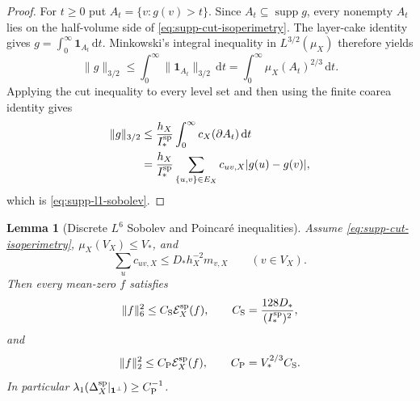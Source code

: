 \documentclass[11pt]{article}
\numberwithin{equation}{section}
\newtheorem{lemma}[lemma]{Lemma}
\theoremstyle{definition}
\theoremstyle{remark}
\newcommand{\one}{\mathbf 1}
\newcommand{\dd}{\mathrm d}
\newcommand{\supp}{\operatorname{supp}}
\begin{document}
\begin{proof}
For $t\ge0$ put $A_t=\{v:g(v)>t\}$.  Since $A_t\subseteq\supp g$, every
nonempty $A_t$ lies on the half-volume side of
\eqref{eq:supp-cut-isoperimetry}.  The layer-cake identity gives
$g=\int_0^\infty\one_{A_t}\,\dd t$.  Minkowski's integral inequality in
$L^{3/2}(\mu_X)$ therefore yields
\begin{equation}
 \|g\|_{3/2}
 \le\int_0^\infty\|\one_{A_t}\|_{3/2}\,\dd t
 =\int_0^\infty\mu_X(A_t)^{2/3}\,\dd t.
 \label{eq:supp-layer-minkowski}
\end{equation}
Applying the cut inequality to every level set and then using the finite
coarea identity gives
\begin{align}
 \|g\|_{3/2}
 &\le \frac{h_X}{I_*^{\rm sp}}
       \int_0^\infty c_X(\partial A_t)\,\dd t \\
 &=\frac{h_X}{I_*^{\rm sp}}
   \sum_{\{u,v\}\in E_X}c_{uv,X}|g(u)-g(v)|,
\end{align}
which is \eqref{eq:supp-l1-sobolev}.
\end{proof}

\begin{lemma}[Discrete $L^6$ Sobolev and Poincar\'e inequalities]
\label{lem:supp-l6-poincare}
Assume \eqref{eq:supp-cut-isoperimetry},
$\mu_X(V_X)\le V_*$, and
\begin{equation}
 \sum_uc_{uv,X}\le D_*h_X^{-2}m_{v,X}
 \qquad(v\in V_X).
 \label{eq:supp-weighted-degree}
\end{equation}
Then every mean-zero $f$ satisfies
\begin{equation}
 \|f\|_6^2\le C_{\rm S}\mathcal E_X^{\rm sp}(f),
 \qquad
 C_{\rm S}=\frac{128D_*}{(I_*^{\rm sp})^2},
 \label{eq:supp-sobolev}
\end{equation}
and
\begin{equation}
 \|f\|_2^2\le C_{\rm P}\mathcal E_X^{\rm sp}(f),
 \qquad C_{\rm P}=V_*^{2/3}C_{\rm S}.
 \label{eq:supp-poincare}
\end{equation}
In particular
$\lambda_1(\Delta_X^{\rm sp}|_{\one^\perp})\ge C_{\rm P}^{-1}$.
\end{lemma}
\end{document}
